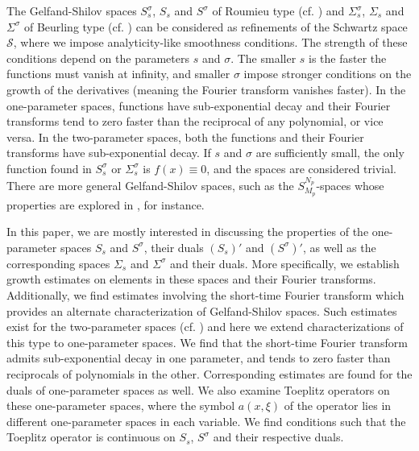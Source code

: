 \documentclass[11pt,a4paper,reqno]{amsart}
\numberwithin{equation}{section}
\theoremstyle{definition}
\theoremstyle{definition}
\begin{document}

The Gelfand-Shilov spaces $S_s^\sigma$, $S_s$ and $S^\sigma$ of Roumieu type (cf. \cite{eijndhoven,gel,chung}) and $\Sigma_s^\sigma$, $\Sigma_s$ and $\Sigma^\sigma$ of Beurling type (cf. \cite{pilip}) can be considered as refinements of the Schwartz space $\mathscr{S}$, where we impose analyticity-like smoothness conditions. The strength of these conditions depend on the parameters $s$ and $\sigma$. The smaller $s$ is the faster the functions must vanish at infinity, and smaller $\sigma$ impose stronger conditions on the growth of the derivatives (meaning the Fourier transform vanishes faster). In the one-parameter spaces, functions have sub-exponential decay and their Fourier transforms tend to zero faster than the reciprocal of any polynomial, or vice versa. In the two-parameter spaces, both the functions and their Fourier transforms have sub-exponential decay. If $s$ and $\sigma$ are sufficiently small, the only function found in $S_s^\sigma$ or $\Sigma_s^\sigma$ is $f(x) \equiv 0$, and the spaces are considered trivial. There are more general Gelfand-Shilov spaces, such as the $S_{M_p}^{N_p}$-spaces whose properties are explored in \cite{chung}, for instance. 

In this paper, we are mostly interested in discussing the properties of the one-parameter spaces $S_s$ and $S^\sigma$, their duals $(S_s)'$ and $(S^\sigma)'$, as well as the corresponding spaces $\Sigma_s$ and $\Sigma^\sigma$ and their duals. More specifically, we establish growth estimates on elements in these spaces and their Fourier transforms. Additionally, we find estimates involving the short-time Fourier transform which provides an alternate characterization of Gelfand-Shilov spaces. Such estimates exist for the two-parameter spaces (cf. \cite{grochenig}) and here we extend characterizations of this type to one-parameter spaces. We find that the short-time Fourier transform admits sub-exponential decay in one parameter, and tends to zero faster than reciprocals of polynomials in the other. Corresponding estimates are found for the duals of one-parameter spaces as well. We also examine Toeplitz operators on these one-parameter spaces, where the symbol $a(x,\xi)$ of the operator lies in different one-parameter spaces in each variable. We find conditions such that the Toeplitz operator is continuous on $S_s$, $S^\sigma$ and their respective duals.
\end{document}

